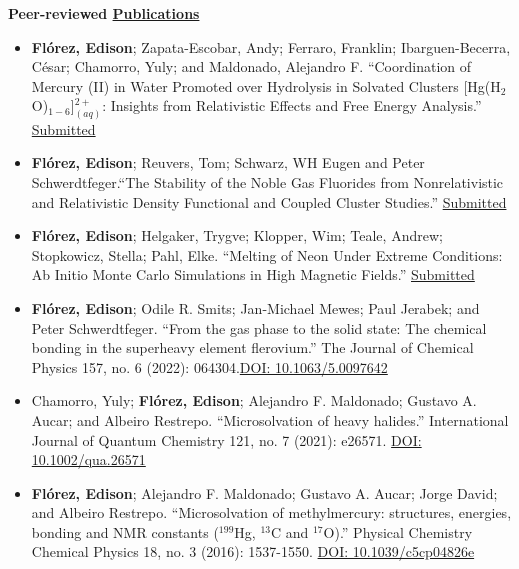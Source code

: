 {\bf\Large Peer-reviewed \href{.}{Publications}}

\begin{itemize}
    \small

    \item \textbf{Flórez, Edison}; Zapata-Escobar, Andy; Ferraro, Franklin; Ibarguen-Becerra, César; Chamorro, Yuly; and Maldonado, Alejandro F. ``Coordination of Mercury (II) in Water Promoted over Hydrolysis in Solvated Clusters [Hg(H$_2$O)$_{1-6}$]$^{2+}_{(aq)}$: Insights from Relativistic Effects and Free Energy Analysis.'' \href{.}{Submitted}

    \item \textbf{Flórez, Edison}; Reuvers, Tom; Schwarz, WH Eugen and Peter Schwerdtfeger.``The Stability of the Noble Gas Fluorides from Nonrelativistic and Relativistic Density Functional and Coupled Cluster Studies.'' \href{.}{Submitted}

    \item \textbf{Flórez, Edison}; Helgaker, Trygve; Klopper, Wim; Teale, Andrew; Stopkowicz, Stella; Pahl, Elke. ``Melting of Neon Under Extreme Conditions: Ab Initio Monte Carlo Simulations in High Magnetic Fields.'' \href{.}{Submitted}

    \item \textbf{Flórez, Edison}; Odile R. Smits; Jan-Michael Mewes; Paul Jerabek; and Peter Schwerdtfeger. ``From the gas phase to the solid state: The chemical bonding in the superheavy element flerovium.'' The Journal of Chemical Physics 157, no. 6 (2022): 064304.\href{https://www.doi.org/10.1063/5.0097642}{DOI: 10.1063/5.0097642}

    \item Chamorro, Yuly;  \textbf{Flórez, Edison}; Alejandro F. Maldonado; Gustavo A. Aucar; and Albeiro Restrepo. ``Microsolvation of heavy halides.'' International Journal of Quantum Chemistry 121, no. 7 (2021): e26571. \href{https://www.doi.org/10.1002/qua.26571}{DOI: 10.1002/qua.26571}

    \item \textbf{Flórez, Edison}; Alejandro F. Maldonado; Gustavo A. Aucar; Jorge David; and Albeiro Restrepo. ``Microsolvation of methylmercury: structures, energies, bonding and NMR constants ($^{199}$Hg, $^{13}$C and $^{17}$O).'' Physical Chemistry Chemical Physics 18, no. 3 (2016): 1537-1550. \href{https://www.doi.org/10.1039/c5cp04826e}{DOI: 10.1039/c5cp04826e}

\end{itemize}


